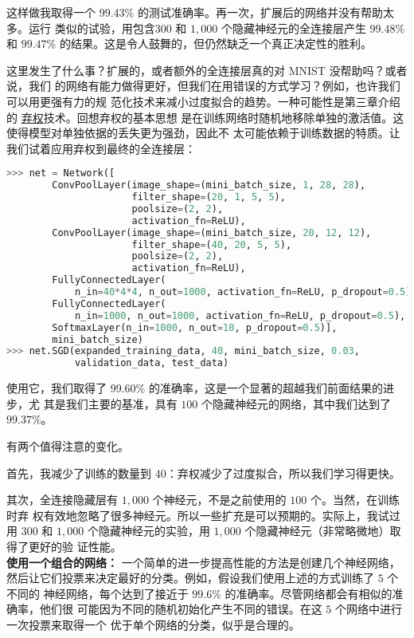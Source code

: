 这样做我取得一个 99.43\% 的测试准确率。再一次，扩展后的网络并没有帮助太多。运行
类似的试验，用包含$300$ 和 $1,000$ 个隐藏神经元的全连接层产生 $99.48$\% 和
$99.47$\% 的结果。这是令人鼓舞的，但仍然缺乏一个真正决定性的胜利。

\label{final_conv}
这里发生了什么事？扩展的，或者额外的全连接层真的对 MNIST 没帮助吗？或者说，我们
的网络有能力做得更好，但我们在用错误的方式学习？例如，也许我们可以用更强有力的规
范化技术来减小过度拟合的趋势。一种可能性是第三章介绍的%
\hyperref[sec:other_techniques_for_regularization]{弃权}技术。回想弃权的基本思想
是在训练网络时随机地移除单独的激活值。这使得模型对单独依据的丢失更为强劲，因此不
太可能依赖于训练数据的特质。让我们试着应用弃权到最终的全连接层：
\begin{lstlisting}[language=Python]
>>> net = Network([
        ConvPoolLayer(image_shape=(mini_batch_size, 1, 28, 28), 
                      filter_shape=(20, 1, 5, 5), 
                      poolsize=(2, 2), 
                      activation_fn=ReLU),
        ConvPoolLayer(image_shape=(mini_batch_size, 20, 12, 12), 
                      filter_shape=(40, 20, 5, 5), 
                      poolsize=(2, 2), 
                      activation_fn=ReLU),
        FullyConnectedLayer(
            n_in=40*4*4, n_out=1000, activation_fn=ReLU, p_dropout=0.5),
        FullyConnectedLayer(
            n_in=1000, n_out=1000, activation_fn=ReLU, p_dropout=0.5),
        SoftmaxLayer(n_in=1000, n_out=10, p_dropout=0.5)], 
        mini_batch_size)
>>> net.SGD(expanded_training_data, 40, mini_batch_size, 0.03, 
            validation_data, test_data)
\end{lstlisting}

使用它，我们取得了 $99.60$\% 的准确率，这是一个显著的超越我们前面结果的进步，尤
其是我们主要的基准，具有 $100$ 个隐藏神经元的网络，其中我们达到了 $99.37$\%。

有两个值得注意的变化。

首先，我减少了训练\epochs{}的数量到 $40$：弃权减少了过度拟合，所以我们学习得更快。

其次，全连接隐藏层有 $1,000$ 个神经元，不是之前使用的 $100$ 个。当然，在训练时弃
权有效地忽略了很多神经元。所以一些扩充是可以预期的。实际上，我试过用 $300$ 和
$1,000$ 个隐藏神经元的实验，用 $1,000$ 个隐藏神经元（非常略微地）取得了更好的验
证性能。\\

\textbf{使用一个组合的网络：} 一个简单的进一步提高性能的方法是创建几个神经网络，
然后让它们投票来决定最好的分类。例如，假设我们使用上述的方式训练了 $5$ 个不同的
神经网络，每个达到了接近于 $99.6$\% 的准确率。尽管网络都会有相似的准确率，他们很
可能因为不同的随机初始化产生不同的错误。在这 $5$ 个网络中进行一次投票来取得一个
优于单个网络的分类，似乎是合理的。


